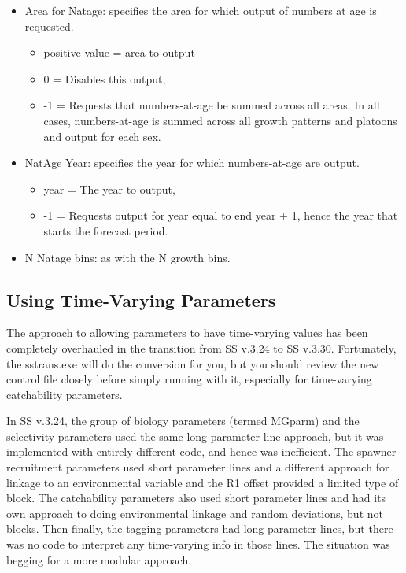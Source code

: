 \begin{itemize}
	\item 	Area for Natage: specifies the area for which output of numbers at age is requested. 
	\begin{itemize}
		\item positive value = area to output
		\item 0 = Disables this output,
		\item -1 = Requests that numbers-at-age be summed across all areas.  In all cases, numbers-at-age is summed across all growth patterns and platoons and output for each sex.
	\end{itemize}

	\item 	NatAge Year:  specifies the year for which numbers-at-age are output.  
	\begin{itemize}
		\item year = The year to output,
		\item -1 = Requests output for year equal to end year + 1, hence the year that starts the forecast period.
	\end{itemize}

	\item N Natage bins: as with the N growth bins.
\end{itemize}



\hypertarget{TVpara}{}
\subsection{Using Time-Varying Parameters}
The approach to allowing parameters to have time-varying values has been completely overhauled in the transition from SS v.3.24 to SS v.3.30.  Fortunately, the sstrans.exe will do the conversion for you, but you should review the new control file closely before simply running with it, especially for time-varying catchability parameters.

In SS v.3.24, the group of biology parameters (termed MGparm) and the selectivity parameters used the same long parameter line approach, but it was implemented with entirely different code, and hence was inefficient.  The spawner-recruitment parameters used short parameter lines and a different approach for linkage to an environmental variable and the R1 offset provided a limited type of block.  The catchability parameters also used short parameter lines and had its own approach to doing environmental linkage and random deviations, but not blocks.  Then finally, the tagging parameters had long parameter lines, but there was no code to interpret any time-varying info in those lines.  The situation was begging for a more modular approach.

